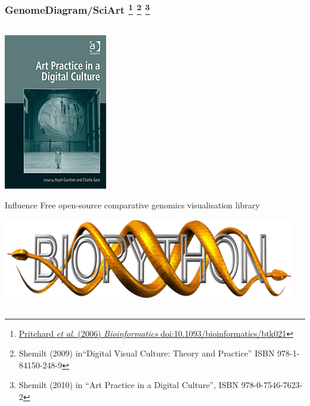 \begin{frame}
  \frametitle{GenomeDiagram/SciArt
  \footnote{\tiny{\href{http://dx.doi.org/10.1093/bioinformatics/btk021}{Pritchard \textit{et al.} (2006) \textit{Bioinformatics} doi:10.1093/bioinformatics/btk021}}}
  \footnote{\tiny{Shemilt (2009) in``Digital Visual Culture: Theory and Practice'' ISBN 978-1-84150-248-9}}
  \footnote{\tiny{Shemilt (2010) in ``Art Practice in a Digital Culture'', ISBN 978-0-7546-7623-2}}
  }
  \begin{columns}[T]
    \begin{column}{3.5cm}  
      \includegraphics[height=0.4\textheight,center]{images/art_practice}      
        \begin{tiny}    
          \begin{alertblock}{Influence}
            Free open-source comparative genomics visualisation library
          \end{alertblock}                
        \end{tiny}          
        \includegraphics[width=1\textwidth]{images/biopython}          
    \end{column}    
    \begin{column}{3.5cm}  

\end{column}
\end{columns}
\end{frame}
